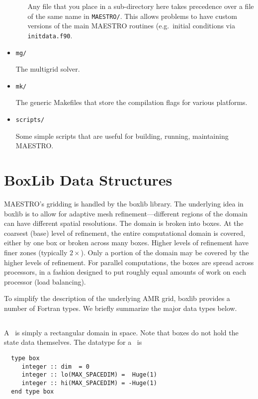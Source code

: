 \begin{itemize}
\begin{itemize}
   Any file that you place in a sub-directory here takes 
   precedence over a file of the same name in {\tt MAESTRO/}.
   This allows problems to have custom versions of the main
   MAESTRO routines (e.g.\ initial conditions via {\tt initdata.f90}.

 \end{itemize}

\item {\tt mg/}

  The multigrid solver.

\item {\tt mk/}

  The generic Makefiles that store the compilation flags for
  various platforms.

\item {\tt scripts/}

  Some simple scripts that are useful for building, running,
  maintaining MAESTRO.

\end{itemize}



\section{BoxLib Data Structures}

MAESTRO's gridding is handled by the boxlib library.  The underlying
idea in boxlib is to allow for adaptive mesh refinement---different
regions of the domain can have different spatial resolutions.  The
domain is broken into boxes.  At the coarsest (base) level of
refinement, the entire computational domain is covered, either by one
box or broken across many boxes.  Higher levels of refinement have
finer zones (typically $2\times$).  Only a portion of the domain may
be covered by the higher levels of refinement.  
For parallel computations, the boxes are spread across processors, in
a fashion designed to put roughly equal amounts of work on each
processor (load balancing).

To simplify the description of the underlying AMR grid, boxlib
provides a number of Fortran types.  We briefly summarize the major
data types below.


\subsection{\boxtype}

A \boxtype\ is simply a rectangular domain in space.  Note that boxes
do not hold the state data themselves.  The datatype for a
\boxtype\ is
\begin{verbatim}
  type box
     integer :: dim  = 0
     integer :: lo(MAX_SPACEDIM) =  Huge(1)
     integer :: hi(MAX_SPACEDIM) = -Huge(1)
  end type box
\end{verbatim}

